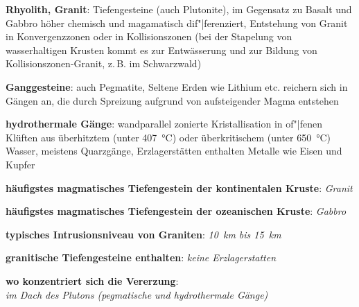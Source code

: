 \textbf{Rhyolith, Granit}:
Tiefengesteine (auch Plutonite),
im Gegensatz zu Basalt und Gabbro höher chemisch und magamatisch dif"|ferenziert,
Entstehung von Granit in Konvergenzzonen oder in Kollisionszonen
(bei der Stapelung von wasserhaltigen Krusten kommt es zur Entwässerung
und zur Bildung von Kollisionszonen-Granit, z.\,B. im Schwarzwald)

\textbf{Ganggesteine}:
auch Pegmatite,
Seltene Erden wie Lithium etc. reichern sich in Gängen an, die durch
Spreizung aufgrund von aufsteigender Magma entstehen

\textbf{hydrothermale Gänge}:
wandparallel zonierte Kristallisation in of"|fenen Klüften aus
überhitztem (unter \SI{407}{\celsius}) oder überkritischem (unter \SI{650}{\celsius}) Wasser,
meistens Quarzgänge,
Erzlagerstätten enthalten Metalle wie Eisen und Kupfer

\begin{wichtig}
    \item
    \textbf{häufigstes magmatisches Tiefengestein der kontinentalen Kruste}:
    \emph{Granit}

    \item
    \textbf{häufigstes magmatisches Tiefengestein der ozeanischen Kruste}:
    \emph{Gabbro}

    \item
    \textbf{typisches Intrusionsniveau von Graniten}:
    \emph{\SI[math-rm=\mathit,text-rm=\itshape]{10}{\kilo\meter} bis
    \SI[math-rm=\mathit,text-rm=\itshape]{15}{\kilo\meter}}

    \item
    \textbf{granitische Tiefengesteine enthalten}:
    \emph{keine Erzlagerstatten}

    \item
    \textbf{wo konzentriert sich die Vererzung}:\\
    \emph{im Dach des Plutons (pegmatische und hydrothermale Gänge)}
\end{wichtig}

\pagebreak
